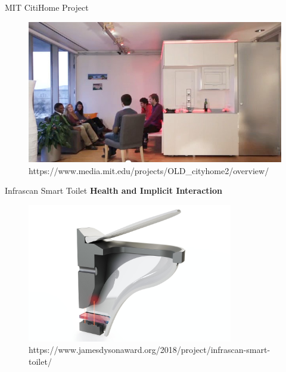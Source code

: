 \documentclass[10pt]{beamer}
\begin{document}
\begin{frame}{MIT CitiHome Project}
	\begin{figure}[H]
	\includegraphics[width=\textwidth]{images/5.jpg}
	\caption{https://www.media.mit.edu/projects/OLD\_cityhome2/overview/}
	\end{figure}
\end{frame}

\begin{frame}{Infrascan Smart Toilet}
	\textbf{Health and Implicit Interaction}\\
	\vspace{3mm}
	\begin{figure}[H]
	\includegraphics[width=0.8\textwidth]{images/7.png}
	\small\caption{https://www.jamesdysonaward.org/2018/project/infrascan-smart-toilet/}
	\end{figure}
\end{frame}
\end{document}
